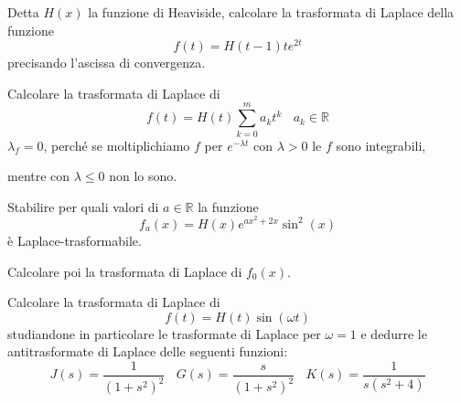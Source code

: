 Detta $\displaystyle H( x)$ la funzione di Heaviside, calcolare la trasformata di Laplace della funzione
\begin{equation*}
f( t) =H( t-1) te^{2t}
\end{equation*}
precisando l'ascissa di convergenza.
\Esercizio{}

Calcolare la trasformata di Laplace di
\begin{equation*}
f( t) =H( t)\sum ^{m}_{k=0} a_{k} t^{k} \ \ \ \ a_{k} \in \mathbb{R}
\end{equation*}
$\displaystyle \lambda _{f} =0$, perché se moltiplichiamo $\displaystyle f$ per $\displaystyle e^{-\lambda t}$ con $\displaystyle \lambda  >0$ le $\displaystyle f$ sono integrabili, 

mentre con $\displaystyle \lambda \leqslant 0$ non lo sono.
\Esercizio{}

Stabilire per quali valori di $\displaystyle a\in \mathbb{R}$ la funzione
\begin{equation*}
f_{a}( x) =H( x) e^{ax^{2} +2x}\sin^{2}( x)
\end{equation*}
è Laplace-trasformabile.

Calcolare poi la trasformata di Laplace di $\displaystyle f_{0}( x)$.
\Esercizio{}

Calcolare la trasformata di Laplace di
\begin{equation*}
f( t) =H( t)\sin( \omega t)
\end{equation*}
studiandone in particolare le trasformate di Laplace per $\displaystyle \omega =1$ e dedurre le antitrasformate di Laplace delle seguenti funzioni:
\begin{equation*}
J( s) =\frac{1}{\left( 1+s^{2}\right)^{2}} \ \ \ \ G( s) =\frac{s}{\left( 1+s^{2}\right)^{2}} \ \ \ \ K( s) =\frac{1}{s\left( s^{2} +4\right)}
\end{equation*}
\ParteSoluzioni
\Soluzione

